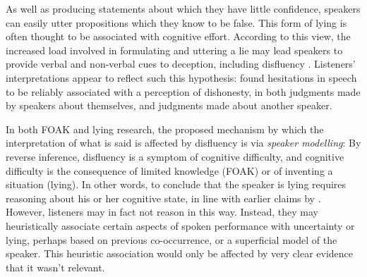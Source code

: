\documentclass[a4paper,man,natbib]{apa6}
\newcommand*{\term}[1]{\emph{#1}} %
\begin{document}

As well as producing statements about which they have little confidence, speakers can easily utter propositions which they know to be false.
This form of lying \citep[see][for another]{frankfurt05} is often thought to be associated with cognitive effort.
According to this view, the increased load involved in formulating and uttering a lie may lead speakers to provide verbal and non-verbal cues to deception, including disfluency \citep{Zuckerman1981,depaulo2003cues}.
Listeners' interpretations appear to reflect such this hypothesis:
\citet{Zuckerman1981} found hesitations in speech to be reliably associated with a perception of dishonesty, in both judgments made by speakers about themselves, and judgments made about another speaker.

In both FOAK and lying research, the proposed mechanism by which the interpretation of what is said is affected by disfluency is via \term{speaker modelling}:
By reverse inference, disfluency is a symptom of cognitive difficulty, and cognitive difficulty is the consequence of limited knowledge (FOAK) or of inventing a situation (lying).
In other words, to conclude that the speaker is lying requires reasoning about his or her cognitive state, in line with earlier claims by \citet{Arnold2007}.
However, listeners may in fact not reason in this way.
Instead, they may heuristically associate certain aspects of spoken performance with uncertainty or lying, perhaps based on previous co-occurrence, or a superficial model of the speaker.
This heuristic association would only be affected by very clear evidence that it wasn't relevant.

\end{document}
